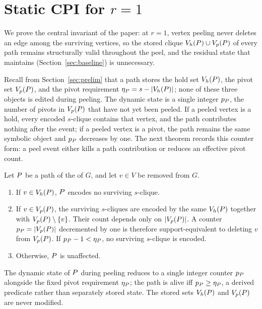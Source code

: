 \section{\texorpdfstring{Static CPI for $r=1$}{Static CPI for r=1}}\label{sec:static}

We prove the central invariant of the paper: at $r{=}1$, vertex peeling never deletes an edge among the surviving vertices, so the stored clique $\Vh(\TPath)\cup\Vp(\TPath)$ of every path remains structurally valid throughout the peel, and the residual state that \cbnd{} maintains (Section~\ref{sec:baseline}) is unnecessary.

Recall from Section~\ref{sec:prelim} that a path stores the hold set $\Vh(\TPath)$, the pivot set $\Vp(\TPath)$, and the pivot requirement $\eta_{\TPath}=s-|\Vh(\TPath)|$; none of these three objects is edited during peeling.
%
The dynamic state is a single integer $p_{\TPath}$, the number of pivots in $\Vp(\TPath)$ that have not yet been peeled.
%
If a peeled vertex is a hold, every encoded $s$-clique contains that vertex, and the path contributes nothing after the event; if a peeled vertex is a pivot, the path remains the same symbolic object and $p_{\TPath}$ decreases by one.
%
The next theorem records this counter form: a peel event either kills a path contribution or reduces an effective pivot count.

\begin{theorem}\label{thm:vertex-removal}
Let $\TPath$ be a path of the \cpi{} of $G$, and let $v\in V$ be removed from $G$.
\begin{enumerate}[leftmargin=1.5em,itemsep=1pt,topsep=2pt]
  \item If $v\in\Vh(\TPath)$, $\TPath$ encodes no surviving $s$-clique.
  \item If $v\in\Vp(\TPath)$, the surviving $s$-cliques are encoded by the same $\Vh(\TPath)$ together with $\Vp(\TPath)\setminus\{v\}$.
%
  Their count depends only on $|\Vp(\TPath)|$.
%
  A counter $p_{\TPath}=|\Vp(\TPath)|$ decremented by one is therefore support-equivalent to deleting $v$ from $\Vp(\TPath)$.
%
  If $p_{\TPath}-1<\eta_{\TPath}$, no surviving $s$-clique is encoded.
  \item Otherwise, $\TPath$ is unaffected.
\end{enumerate}
The dynamic state of $\TPath$ during peeling reduces to a single integer counter $p_{\TPath}$ alongside the fixed pivot requirement $\eta_{\TPath}$; the path is alive iff $p_{\TPath}\ge\eta_{\TPath}$, a derived predicate rather than separately stored state.
%
The stored sets $\Vh(\TPath)$ and $\Vp(\TPath)$ are never modified.
\end{theorem}

